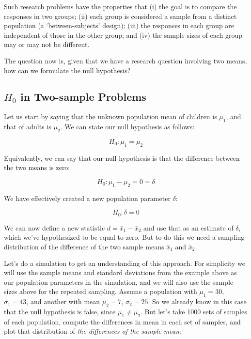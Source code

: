 \documentclass[12pt]{book}\usepackage[]{graphicx}\usepackage[]{color}
\begin{document}
Such research problems have the properties that 
(i) the goal is to compare the responses in two groups;
(ii) each group is considered a sample from a distinct population (a `between-subjects' design);
(iii) the responses in each group are independent of those in the other group; and
(iv) the sample sizes of each group may or may not be different. 

The question now is, given that we have a research question involving two means, how can we formulate the null hypothesis?

\subsection{$H_0$ in Two-sample Problems}

Let us start by saying that the unknown population mean of children is $\mu_1$, and that of adults is $\mu_2$. 
We can state our null hypothesis as follows:

\begin{equation}
H_0: \mu_1 = \mu_2
\end{equation}

\label{twosampleproblemsnull}
Equivalently, we can say that our null hypothesis is that the difference between the two means is zero:

\begin{equation}
H_0: \mu_1 - \mu_2 = 0 = \delta
\end{equation}

We have effectively created a new population parameter $\delta$:

\begin{equation}
H_0: \delta = 0
\end{equation}

We can now define a new statistic $d = \bar{x}_1 - \bar{x}_2$ and
use that as an estimate of $\delta$, which we've hypothesized to be
equal to zero.  But to do this we need a sampling distribution of the
difference of the two sample means $\bar{x}_1$ and  $\bar{x}_2$.

Let's do a simulation to get an understanding of this approach.
For simplicity we will use the sample means and standard deviations from the example above as our population parameters in the simulation, and we will also use the sample sizes above for the repeated sampling.
Assume a population with $\mu_1 = 30$, $\sigma_1 = 43$, and
another with mean $\mu_2 = 7$, $\sigma_2 = 25$.  So we already know
in this case that the null hypothesis is false, since $\mu_1 \neq \mu_2$.  But let's take 1000
sets of samples of each population, compute the differences in mean in
each set of samples, and plot that distribution of \emph{the differences of
the sample mean}:
\end{document}
